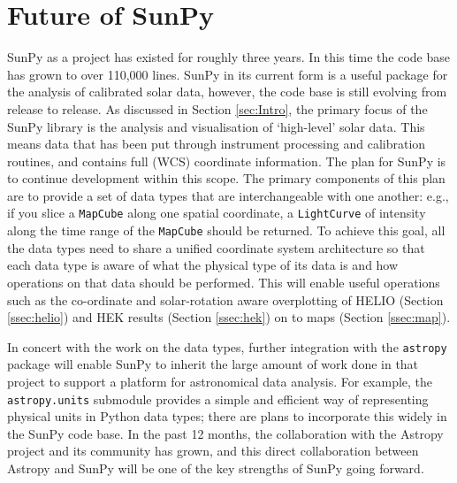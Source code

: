 \section{Future of SunPy}\label{sec:future}
SunPy as a project has existed for roughly three years. In this time 
the code 
base has grown to over 110,000 lines. SunPy in its current form is a 
useful 
package for the analysis of calibrated solar data, however, the code 
base is 
still evolving from release to release.
As discussed in Section \ref{sec:Intro}, the primary focus of the 
SunPy library is the analysis and visualisation of `high-level' solar 
data. This means data that has been put through instrument processing 
and 
calibration routines, and contains full (WCS) coordinate information. 
The plan for SunPy is to continue development within this 
scope. The 
primary components of this plan are to provide a set of data types 
that are 
interchangeable with one another: e.g., if you slice a 
\texttt{MapCube} 
along one spatial coordinate, a \texttt{LightCurve} of intensity along the 
time range of 
the \texttt{MapCube} should be returned. To achieve this goal, all the 
data 
types need to share a unified coordinate system architecture so that 
each data 
type is aware of what the physical type of its data is and how 
operations on 
that data should be performed. This will enable useful operations
such as the co-ordinate and solar-rotation aware 
overplotting of HELIO (Section \ref{ssec:helio}) and HEK
results (Section \ref{ssec:hek}) on to maps (Section \ref{ssec:map}).

In concert with the work on the data types, further integration with 
the 
\texttt{astropy} package will enable SunPy to inherit the large 
amount of work 
done in that project to support a platform for astronomical data 
analysis. For 
example, the \texttt{astropy.units} submodule provides a simple and 
efficient 
way of representing physical units in Python data types; there are 
plans to 
incorporate this widely in the SunPy code base. In the past 12 months, 
the 
collaboration with the Astropy project 
\citep{theastropycollaboration2013} and 
its community has grown, and this direct collaboration between Astropy 
and 
SunPy will be one of the key strengths of SunPy going forward.

